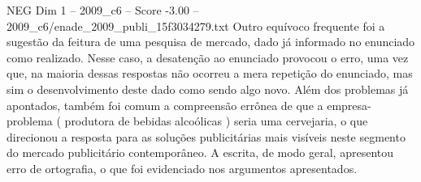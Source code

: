 \begin{textsample}{NEG Dim 1 – 2009\_c6 – Score -3.00 – 2009\_c6/enade\_2009\_publi\_15f3034279.txt}
Outro equívoco frequente foi a sugestão da feitura de uma pesquisa de mercado, dado já informado no enunciado como realizado.
Nesse caso, a desatenção ao enunciado provocou o erro, uma vez que, na maioria dessas respostas não ocorreu a mera repetição do enunciado, mas sim o desenvolvimento deste dado como sendo algo novo.
Além dos problemas já apontados, também foi comum a compreensão errônea de que a empresa-problema ( produtora de bebidas alcoólicas ) seria uma cervejaria, o que direcionou a resposta para as soluções publicitárias mais visíveis neste segmento do mercado publicitário contemporâneo.
A escrita, de modo geral, apresentou erro de ortografia, o que foi evidenciado nos argumentos apresentados.

\end{textsample}
